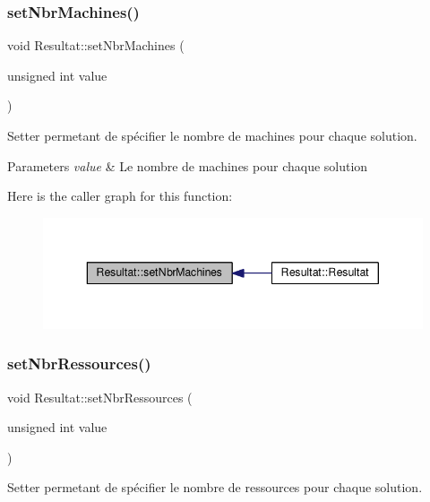\subsubsection{\texorpdfstring{set\+Nbr\+Machines()}{setNbrMachines()}}
{\footnotesize\ttfamily void Resultat\+::set\+Nbr\+Machines (\begin{DoxyParamCaption}\item[{unsigned int}]{value }\end{DoxyParamCaption})}



Setter permetant de spécifier le nombre de machines pour chaque solution. 


\begin{DoxyParams}{Parameters}
{\em value} & Le nombre de machines pour chaque solution \\
\hline
\end{DoxyParams}
Here is the caller graph for this function\+:\nopagebreak
\begin{figure}[H]
\begin{center}
\leavevmode
\includegraphics[width=343pt]{classResultat_a5de638751a3dadde3d8765663a3d1403_icgraph}
\end{center}
\end{figure}
\mbox{\label{classResultat_a3e4e337fd9d39bf566a26873c9c4410c}} 
\subsubsection{\texorpdfstring{set\+Nbr\+Ressources()}{setNbrRessources()}}
{\footnotesize\ttfamily void Resultat\+::set\+Nbr\+Ressources (\begin{DoxyParamCaption}\item[{unsigned int}]{value }\end{DoxyParamCaption})}



Setter permetant de spécifier le nombre de ressources pour chaque solution. 



